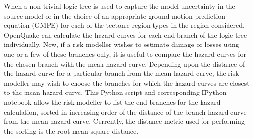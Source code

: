 When a non-trivial logic-tree is used to capture the model uncertainty in the source model or in the choice of an appropriate ground motion prediction equation (GMPE) for each of the tectonic region types in the region considered, OpenQuake can calculate the hazard curves for each end-branch of the logic-tree individually. Now, if a risk modeller wishes to estimate damage or losses using one or a few of these branches only, it is useful to compare the hazard curves for the chosen branch with the mean hazard curve. Depending upon the distance of the hazard curve for a particular branch from the mean hazard curve, the risk modeller may wish to choose the branches for which the hazard curves are closest to the mean hazard curve. This Python script and corresponding IPython notebook allow the risk modeller to list the end-branches for the hazard calculation, sorted in increasing order of the distance of the branch hazard curve from the mean hazard curve. Currently, the distance metric used for performing the sorting is the root mean square distance.